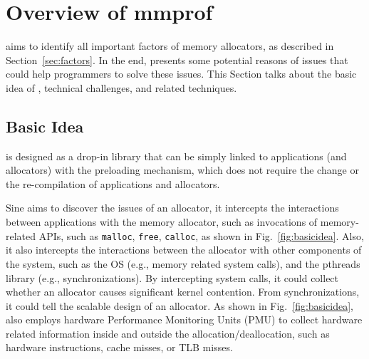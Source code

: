 \section{Overview of mmprof}
\label{sec:overview}

\MP{} aims to identify all important factors of memory allocators, as described in Section~\ref{sec:factors}. In the end, \MP{} presents some potential reasons of issues that could help programmers to solve these issues. This Section talks about the basic idea of \MP{}, technical challenges, and related techniques.  

\subsection{Basic Idea}

\MP{} is designed as a drop-in library that can be simply linked to applications (and allocators) with the preloading mechanism, which does not require the change or the re-compilation of applications and allocators.

Sine \MP{} aims to discover the issues of an  allocator, it intercepts the interactions between applications with the memory allocator, such as invocations of memory-related APIs, such as \texttt{malloc}, \texttt{free}, \texttt{calloc}, as shown in Fig.~\ref{fig:basicidea}. Also, it also intercepts the interactions between the allocator with other components of the system, such as the OS (e.g., memory related system calls), and the pthreads library (e.g., synchronizations). By intercepting system calls, it could collect whether an allocator causes significant kernel contention. From synchronizations, it could tell the scalable design of an allocator. As shown in Fig.~\ref{fig:basicidea}, \MP{} also employs hardware Performance Monitoring Units (PMU) to collect hardware related information inside and outside the allocation/deallocation, such as hardware instructions, cache misses, or TLB misses. %
 
